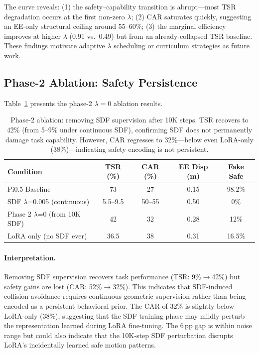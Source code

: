 \documentclass[10pt,twocolumn]{article}
\begin{document}
The curve reveals: (1) the safety--capability transition is abrupt---most TSR degradation occurs at the first non-zero $\lambda$; (2) CAR saturates quickly, suggesting an EE-only structural ceiling around 55--60\%; (3) the marginal efficiency improves at higher $\lambda$ (0.91 vs.\ 0.49) but from an already-collapsed TSR baseline. These findings motivate adaptive $\lambda$ scheduling or curriculum strategies as future work.

\subsection{Phase-2 Ablation: Safety Persistence}
\label{sec:phase2}

Table~\ref{tab:phase2} presents the phase-2 $\lambda=0$ ablation results.

\begin{table}[h]
\centering
\caption{Phase-2 ablation: removing SDF supervision after 10K steps. TSR recovers to 42\% (from 5--9\% under continuous SDF), confirming SDF does not permanently damage task capability. However, CAR regresses to 32\%---below even LoRA-only (38\%)---indicating safety encoding is not persistent.}
\label{tab:phase2}
\small
\begin{tabular}{lcccc}
\toprule
Condition & TSR (\%) & CAR (\%) & EE Disp (m) & Fake Safe \\
\midrule
Pi0.5 Baseline & 73 & 27 & 0.15 & 98.2\% \\
SDF $\lambda$=0.005 (continuous) & 5.5--9.5 & 50--55 & 0.50 & 0\% \\
Phase 2 $\lambda$=0 (from 10K SDF) & 42 & 32 & 0.28 & 12\% \\
LoRA only (no SDF ever) & 36.5 & 38 & 0.31 & 16.5\% \\
\bottomrule
\end{tabular}
\end{table}

\paragraph{Interpretation.}
Removing SDF supervision recovers task performance (TSR: 9\%$\to$42\%) but safety gains are lost (CAR: 52\%$\to$32\%). This indicates that SDF-induced collision avoidance requires continuous geometric supervision rather than being encoded as a persistent behavioral prior. The CAR of 32\% is slightly below LoRA-only (38\%), suggesting that the SDF training phase may mildly perturb the representation learned during LoRA fine-tuning. The 6\,pp gap is within noise range but could also indicate that the 10K-step SDF perturbation disrupts LoRA's incidentally learned safe motion patterns.
\end{document}
